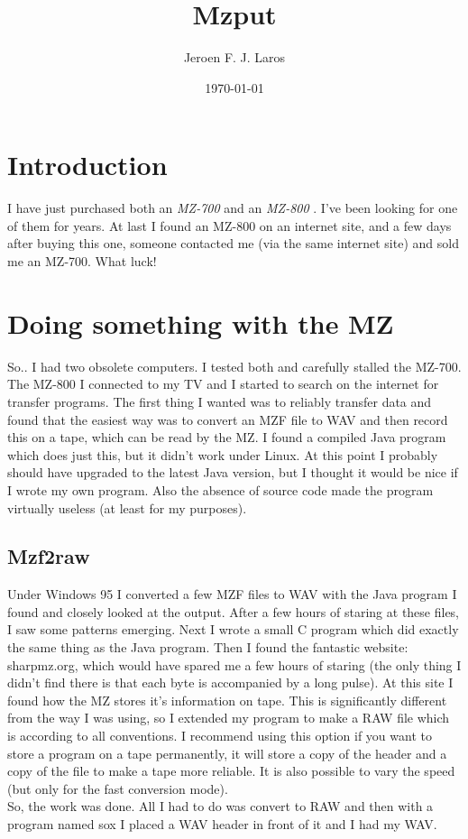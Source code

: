 \title{\Huge Mzput}
\author{Jeroen F. J. Laros}
\date{\today}
\frenchspacing
\linethickness{1pt}


\maketitle
\newpage

\tableofcontents
\newpage

\section{Introduction}
I have just purchased both an \emph{MZ-700} and an \emph{MZ-800} \cite{MZ}. 
I've been looking for one 
of them for years. At last I found an MZ-800 on an internet site, and a few 
days after buying this one, someone contacted me (via the same internet site)
and sold me an MZ-700. What luck!

\section{Doing something with the MZ}
So.. I had two obsolete computers. I tested both and carefully stalled the
MZ-700. The MZ-800 I connected to my TV and I started to search on the internet
for transfer programs. The first thing I wanted was to reliably transfer data
and found that the easiest way was to convert an MZF file to WAV and then 
record this on a tape, which can be read by the MZ. I found a compiled Java
program which does just this, but it didn't work under Linux. At this point
I probably should have upgraded to the latest Java version, but I thought it
would be nice if I wrote my own program. Also the absence of source code made
the program virtually useless (at least for my purposes).

\subsection{Mzf2raw}
Under Windows 95 I converted a few MZF files to WAV with the Java program I
found and closely looked at the output. After a few hours of staring at these
files, I saw some patterns emerging. Next I wrote a small C program which did
exactly the same thing as the Java program. Then I found the fantastic website:
sharpmz.org, which would have spared me a few hours of staring (the only
thing I didn't find there is that each byte is accompanied by a long pulse).
At this site I found how the MZ stores it's information on tape. This is
significantly different from the way I was using, so I extended my program to
make a RAW file which is according to all conventions. I recommend using this
option if you want to store a program on a tape permanently, it will store a
copy of the header and a copy of the file to make a tape more reliable. It is
also possible to vary the speed (but only for the fast conversion mode). \\
So, the work was done. All I had to do was convert to RAW and then with a
program named sox I placed a WAV header in front of it and I had my WAV.

